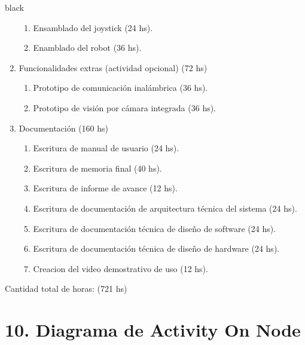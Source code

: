 \documentclass[
11pt, %
]{charter}
\begin{document}
\begin{consigna}{black}
\begin{enumerate}
	\begin{enumerate}
	\item Ensamblado del joystick (24 hs).
	\item Enamblado del robot (36 hs).
	\end{enumerate}
\item Funcionalidades extras (actividad opcional) (72 hs)
	\begin{enumerate}
	\item Prototipo de comunicación inalámbrica (36 hs).
	\item Prototipo de visión por cámara integrada (36 hs).
	\end{enumerate}
\item Documentación (160 hs)
	\begin{enumerate}				
	\item Escritura de manual de usuario (24 hs).			
	\item Escritura de memoria final (40 hs).
	\item Escritura de informe de avance (12 hs).
	\item Escritura de documentación de arquitectura técnica del sistema (24 hs).
	\item Escritura de documentación técnica de diseño de software (24 hs).
	\item Escritura de documentación técnica de diseño de hardware (24 hs).		
	\item Creacion del video demostrativo de uso (12 hs).				
	\end{enumerate}	
\end{enumerate}

Cantidad total de horas: (721 hs)

\end{consigna}

\section{10. Diagrama de Activity On Node}
\label{sec:AoN}
\end{document}
